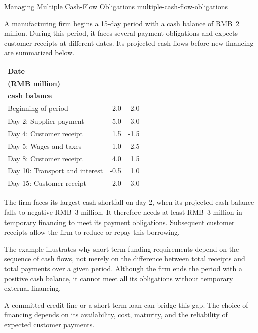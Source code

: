 \begin{example}{Managing Multiple Cash-Flow Obligations}
{multiple-cash-flow-obligations}

A manufacturing firm begins a 15-day period with a
cash balance of RMB~2 million. During this period,
it faces several payment obligations and expects
customer receipts at different dates. Its projected
cash flows before new financing are summarized below.

\begin{center}
\begin{tabular}{lrr}
\toprule
\textbf{Date} &
\shortstack[c]{\textbf{Cash flow}\\\textbf{(RMB million)}} &
\shortstack[c]{\textbf{Cumulative}\\\textbf{cash balance}} \\
\midrule
Beginning of period & 2.0 & 2.0 \\
Day 2: Supplier payment & -5.0 & -3.0 \\
Day 4: Customer receipt & 1.5 & -1.5 \\
Day 5: Wages and taxes & -1.0 & -2.5 \\
Day 8: Customer receipt & 4.0 & 1.5 \\
Day 10: Transport and interest & -0.5 & 1.0 \\
Day 15: Customer receipt & 2.0 & 3.0 \\
\bottomrule
\end{tabular}
\end{center}

The firm faces its largest cash shortfall on day 2,
when its projected cash balance falls to negative
RMB~3 million. It therefore needs at least RMB~3
million in temporary financing to meet its payment
obligations. Subsequent customer receipts allow the
firm to reduce or repay this borrowing.

The example illustrates why short-term funding
requirements depend on the sequence of cash flows,
not merely on the difference between total receipts
and total payments over a given period. Although
the firm ends the period with a positive cash balance,
it cannot meet all its obligations without temporary
external financing.

A committed credit line or a short-term loan can
bridge this gap. The choice of financing depends on
its availability, cost, maturity, and the reliability
of expected customer payments.

\end{example}

